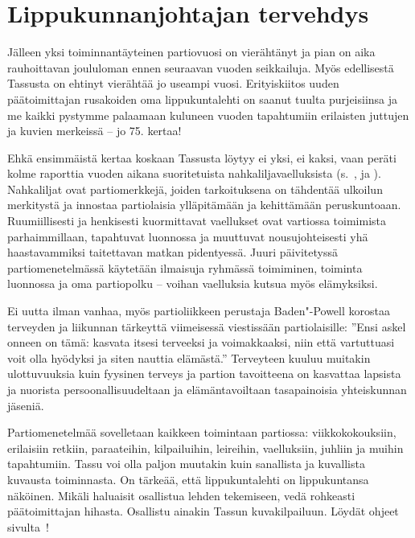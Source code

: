 \section{Lippukunnanjohtajan tervehdys}

\begin{multicols}{2}
\noindent Jälleen yksi toiminnantäyteinen partiovuosi on vierähtänyt ja 
pian on aika rauhoittavan joululoman ennen seuraavan vuoden seikkailuja. Myös 
edellisestä Tassusta on ehtinyt vierähtää jo useampi vuosi. Erityiskiitos 
uuden päätoimittajan rusakoiden oma lippukuntalehti on saanut tuulta 
purjeisiinsa ja me kaikki pystymme palaamaan kuluneen vuoden tapahtumiin 
erilaisten juttujen ja kuvien merkeissä -- jo 75. kertaa!

Ehkä ensimmäistä kertaa koskaan Tassusta löytyy ei yksi, ei kaksi, vaan 
peräti kolme raporttia vuoden aikana suoritetuista nahkaliljavaelluksista 
(s.~\pageref{section:vihreaNahkalilja}, \pageref{section:mustaNahkalilja} ja 
\pageref{section:punainenNahkalilja}). Nahkaliljat ovat partiomerkkejä, joiden 
tarkoituksena on tähdentää ulkoilun merkitystä ja innostaa partiolaisia 
ylläpitämään ja kehittämään peruskuntoaan. Ruumiillisesti ja henkisesti 
kuormittavat vaellukset ovat vartiossa toimimista parhaimmillaan, tapahtuvat 
luonnossa ja muuttuvat nousujohteisesti yhä haastavammiksi taitettavan matkan 
pidentyessä. Juuri päivitetyssä partiomenetelmässä käytetään ilmaisuja 
ryhmässä toimiminen, toiminta luonnossa ja oma partiopolku -- voihan 
vaelluksia kutsua myös elämyksiksi.

Ei uutta ilman vanhaa, myös partioliikkeen perustaja Baden"-Powell korostaa 
terveyden ja liikunnan tärkeyttä viimeisessä viestissään partiolaisille: 
''Ensi askel onneen on tämä: kasvata itsesi terveeksi ja voimakkaaksi, niin 
että vartuttuasi voit olla hyödyksi ja siten nauttia elämästä.'' 
Terveyteen kuuluu muitakin ulottuvuuksia kuin fyysinen terveys ja partion 
tavoitteena on kasvattaa lapsista ja nuorista persoonallisuudeltaan ja 
elämäntavoiltaan tasapainoisia yhteiskunnan jäseniä.

Partiomenetelmää sovelletaan kaikkeen toimintaan partiossa: viikkokokouksiin, 
erilaisiin retkiin, paraateihin, kilpailuihin, leireihin, vaelluksiin, juhliin 
ja muihin tapahtumiin. Tassu voi olla paljon muutakin kuin sanallista ja 
kuvallista kuvausta toiminnasta. On tärkeää, että lippukuntalehti on 
lippukuntansa näköinen. Mikäli haluaisit osallistua lehden tekemiseen, vedä 
rohkeasti päätoimittajan hihasta. Osallistu ainakin Tassun kuvakilpailuun. 
Löydät ohjeet sivulta~\pageref{section:kuvakilpailu}!


\end{multicols}
